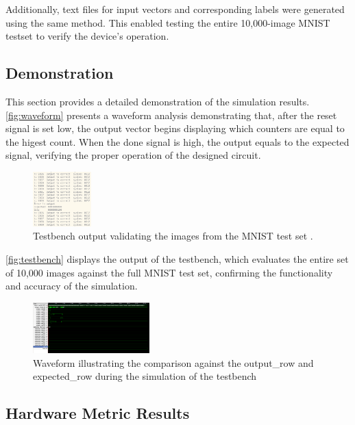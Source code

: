 \documentclass[conference]{IEEEtran}
\begin{document}
Additionally, text files for input vectors and corresponding labels were generated using the same method. This enabled testing the entire 10,000-image MNIST \cite{mnist} testset to verify the device's operation.




\subsection{Demonstration}
This section provides a detailed demonstration of the simulation results. 
\autoref{fig:waveform} presents a waveform analysis demonstrating that, after the reset signal is set low, the output vector begins displaying which counters are equal to the higest count. When the done signal is high, the output equals to the expected signal, verifying the proper operation of the designed circuit.

\begin{figure}[h]
    \centering
    \includegraphics[width=0.2\textwidth]{./testbench.png}
    \caption{Testbench output validating the images from the MNIST test set \cite{mnist}.}
    \label{fig:testbench}
\end{figure}

\autoref{fig:testbench} displays the output of the testbench, which evaluates the entire set of 10,000 images against the full MNIST test set, confirming the functionality and accuracy of the simulation.

\begin{figure}[h]
    \centering
    \includegraphics[width=0.4\textwidth]{./Waveform_picture.png}
    \caption{Waveform illustrating the comparison against the output\_row and expected\_row during the simulation of the testbench}
    \label{fig:waveform}
\end{figure}





\subsection{Hardware Metric Results}
\label{ref:hardware_metrics}
\end{document}
